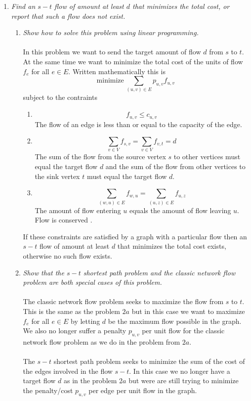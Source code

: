 \documentclass[12pt]{article}
\begin{document}
\begin{enumerate}
  \newpage
  \item \textit{Find an $s-t$ flow of amount at least $d$ that minimizes the
  total cost, or report that such a flow does not exist.}
  \begin{enumerate}
    \item \textit{Show how to solve this problem using linear programming.}\\
    \\
    In this problem we want to send the target amount of flow $d$ from $s$ to
    $t$.  At the same time we want to minimize the total cost of the units
    of flow $f_e$ for all $e \in E$.  Written mathematically this is 
    $$
    \text{minimize} \, \sum_{(u,v) \in E} p_{u,v}f_{u,v}
    $$
    subject to the contraints
    \begin{enumerate}
      
      \item 
      $$
      f_{u,v} \le c_{u,v}
      $$
      The flow of an edge is less than or equal to the capacity of the edge. 
      
      \item
      $$
      \sum_{v \in V} f_{s,v} = \sum_{v \in V} f_{v,t} = d
      $$
      The sum of the flow from the source vertex $s$ to other vertices must
      equal the target flow $d$ and the sum of the flow from other vertices to
      the sink vertex $t$ must equal the target flow $d$.
      
      \item
      $$
      \sum_{(w,u) \in E} f_{w,u} = \sum_{(u,z) \in E} f_{u,z}
      $$
      The amount of flow entering $u$ equals the amount of flow leaving $u$.
      Flow is conserved \cite{2}.
    \end{enumerate}
    If these constraints are satisfied by a graph with a particular flow then an
    $s-t$ flow of amount at least $d$ that minimizes the total cost exists,
    otherwise no such flow exists.
     
    \item \textit{Show that the $s-t$ shortest path problem and the classic
    network flow problem are both special cases of this problem.}\\
    \\
    The classic network flow problem seeks to maximize the flow from $s$ to $t$.
    This is the same as the problem $2a$ but in this case we want to
    maximize $f_e$ for all $e \in E$ by letting $d$ be the maximum flow possible
    in the graph.  We also no longer suffer a penalty $p_{u,v}$ per unit flow
    for the classic network flow problem as we do in the problem from $2a$.\\
    \\
    The $s-t$ shortest path problem seeks to minimize the sum of the cost of the
    edges involved in the flow $s-t$.  In this case we no longer have a target
    flow $d$ as in the problem $2a$ but were are still trying to minimize the
    penalty/cost $p_{u,v}$ per edge per unit flow in the graph.
  \end{enumerate}
  

\end{enumerate}
\end{document}
